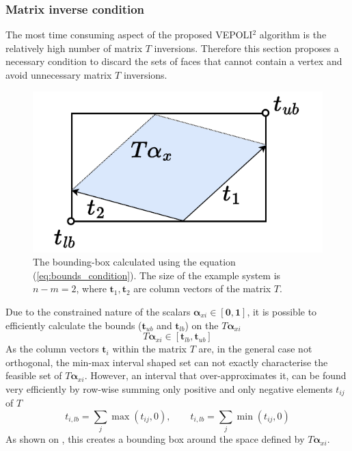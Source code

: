 \subsubsection{Matrix inverse condition} 

The most time consuming aspect of the proposed VEPOLI$^2$ algorithm is the relatively high number of matrix $T$ inversions. Therefore this section proposes a necessary condition to discard the sets of faces that cannot contain a vertex and avoid unnecessary matrix $T$ inversions.

\begin{figure}
    \centering
    \includegraphics[width=\linewidth]{Papers/images/matrix_condition.pdf}
    \caption{The bounding-box calculated using the equation (\ref{eq:bounds_condition}). The size of the example system is $n\!-\!m\!=\!2$, where $\bm{t}_1,\bm{t}_2$ are column vectors of the matrix $T$.}
    \label{fig:matrix_condition}
\end{figure}
Due to the constrained nature of the scalars $\bm{\alpha}_{xi}\in[\bm{0},\bm{1}]$, it is possible to efficiently calculate the bounds (${\bm{t}_{ub}}$ and $\bm{t}_{lb}$) on the $T\bm{\alpha}_{xi}$ 
\begin{equation}
    T\bm{\alpha}_{xi}  \in [\bm{t}_{lb}, \bm{t}_{ub}]\label{eq:necesassry_condition}
\end{equation}
As the column vectors $\bm{t}_i$ within the matrix $T$ are, in the general case not orthogonal, the min-max interval shaped set can not exactly characterise the feasible set of $T\bm{\alpha}_{xi}$. However, an interval that over-approximates it, can be found very efficiently by row-wise summing only positive and only negative elements $t_{ij}$ of  $T$
\begin{equation}
t_{i,lb} = \sum_j \max(t_{ij}, 0), \qquad
t_{i,lb} = \sum_j \min(t_{ij}, 0) 
\label{eq:bounds_condition}
\end{equation}
As shown on , this creates a bounding box around the space defined by  $T\bm{\alpha}_{xi}$.

